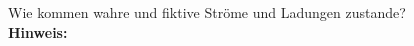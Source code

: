 \begin{question}[section=,subsection=,name={Wahre und fiktive Ladungen und Ströme},difficulty=,type=mdl,tags={}]
	Wie kommen wahre und fiktive Ströme und Ladungen zustande?
	\\ \textbf{Hinweis:}\\
	
\end{question}
\begin{solution}
	
\end{solution}